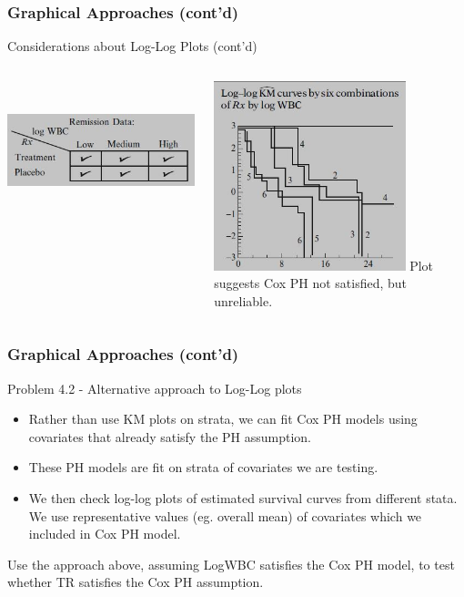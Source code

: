 \documentclass{beamer}
\theoremstyle{definition}
\begin{document}
\begin{frame}
\frametitle{Graphical Approaches (cont'd)}
\begin{block}{Considerations about Log-Log Plots (cont'd)}
\begin{columns}
    \begin{column}{0.48\textwidth}
        \includegraphics[width =\textwidth, height=4cm]{CH4_loglogMC.JPG}
    \end{column}
    \hspace{-10pt}
    \begin{column}{0.48\textwidth}
         \includegraphics[width =\textwidth, height=5.5cm]{Ch4_loglog6.JPG}
          Plot suggests Cox PH not satisfied, but unreliable. 
    \end{column}
\end{columns}
\end{block}
\end{frame}

\begin{frame}
\frametitle{Graphical Approaches (cont'd)}
\begin{block}{Problem 4.2 - Alternative approach to Log-Log plots} 
\begin{itemize}
\item Rather than use KM plots on strata, we can fit Cox PH models using covariates that already satisfy the PH assumption. 
\item These PH models are fit on strata of covariates we are testing.
\item We then check log-log plots of estimated survival curves from different stata.  We use representative values (eg. overall mean) of covariates which we included in Cox PH model.
\end{itemize}
Use the approach above, assuming LogWBC satisfies the Cox PH model, to test whether TR satisfies the Cox PH assumption.   
\end{block}
\end{frame}
\end{document}
